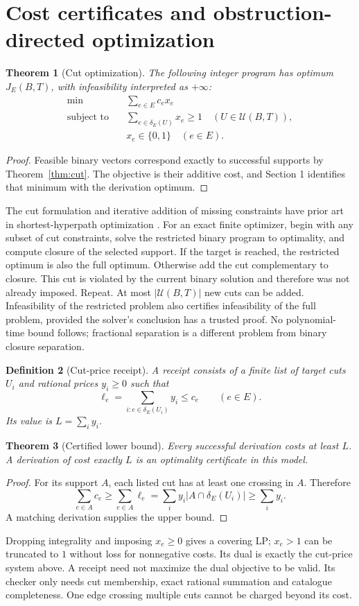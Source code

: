 \documentclass[11pt]{article}
\newtheorem{theorem}{Theorem}[section]
\newtheorem{definition}[theorem]{Definition}
\theoremstyle{remark}\newtheorem{remark}[theorem]{Remark}
\newcommand{\cU}{\mathcal U}
\begin{document}
\section{Cost certificates and obstruction-directed optimization}
\begin{theorem}[Cut optimization]\label{thm:ip}
The following integer program has optimum $J_E(B,T)$, with infeasibility interpreted as $+\infty$:
\begin{align}
\min\quad&\sum_{e\in E}c_e x_e\\
\text{subject to}\quad&\sum_{e\in\delta_E(U)}x_e\geq1\quad(U\in\cU(B,T)),\\
&x_e\in\{0,1\}\quad(e\in E).
\end{align}
\end{theorem}
\begin{proof}
Feasible binary vectors correspond exactly to successful supports by Theorem~\ref{thm:cut}. The objective is their additive cost, and Section 1 identifies that minimum with the derivation optimum.
\end{proof}
The cut formulation and iterative addition of missing constraints have prior art in shortest-hyperpath optimization \cite{krieger}. For an exact finite optimizer, begin with any subset of cut constraints, solve the restricted binary program to optimality, and compute closure of the selected support. If the target is reached, the restricted optimum is also the full optimum. Otherwise add the cut complementary to closure. This cut is violated by the current binary solution and therefore was not already imposed. Repeat. At most $|\cU(B,T)|$ new cuts can be added. Infeasibility of the restricted problem also certifies infeasibility of the full problem, provided the solver's conclusion has a trusted proof. No polynomial-time bound follows; fractional separation is a different problem from binary closure separation.

\begin{definition}[Cut-price receipt]
A receipt consists of a finite list of target cuts $U_i$ and rational prices $y_i\geq0$ such that
\[
\ell_e=\sum_{i:e\in\delta_E(U_i)}y_i\leq c_e\qquad(e\in E).
\]
Its value is $L=\sum_i y_i$.
\end{definition}
\begin{theorem}[Certified lower bound]\label{thm:price}
Every successful derivation costs at least $L$. A derivation of cost exactly $L$ is an optimality certificate in this model.
\end{theorem}
\begin{proof}
For its support $A$, each listed cut has at least one crossing in $A$. Therefore
\[
\sum_{e\in A}c_e\geq\sum_{e\in A}\ell_e
=\sum_i y_i|A\cap\delta_E(U_i)|\geq\sum_i y_i.
\]
A matching derivation supplies the upper bound.
\end{proof}
Dropping integrality and imposing $x_e\geq0$ gives a covering LP; $x_e>1$ can be truncated to $1$ without loss for nonnegative costs. Its dual is exactly the cut-price system above. A receipt need not maximize the dual objective to be valid. Its checker only needs cut membership, exact rational summation and catalogue completeness. One edge crossing multiple cuts cannot be charged beyond its cost.
\end{document}
